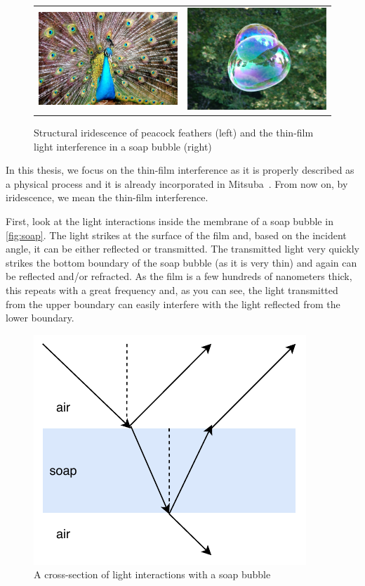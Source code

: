 \begin{figure}
	\centering
	\begin{tabular}{cc}
		\includegraphics[width=0.4\linewidth]{img/iridescent_peacock.jpg}
		&
		\includegraphics[width=0.4\linewidth]{img/iridescent_soap.jpg}
	\end{tabular}
	\caption[Irid example]{Structural iridescence of peacock feathers (left) and the thin-film light interference in a soap bubble (right)\footnotemark}
	\label{fig:iridescent_example}
\end{figure}

In this thesis, we focus on the thin-film interference as it is properly described as a physical process and it is already incorporated in Mitsuba~\cite{belcour2017practical}. From now on, by iridescence, we mean the thin-film interference.

First, look at the light interactions inside the membrane of a soap bubble in \autoref{fig:soap}. The light strikes at the surface of the film and, based on the incident angle, it can be either reflected or transmitted. The transmitted light very quickly strikes the bottom boundary of the soap bubble (as it is very thin) and again can be reflected and/or refracted. As the film is a few hundreds of nanometers thick, this repeats with a great frequency and, as you can see, the light transmitted from the upper boundary can easily interfere with the light reflected from the lower boundary.

\begin{figure}[h]
	\centering
	\includegraphics[width=.6\linewidth]{img/soap.pdf}
	\caption{A cross-section of light interactions with a soap bubble}
	\label{fig:soap}
\end{figure}

